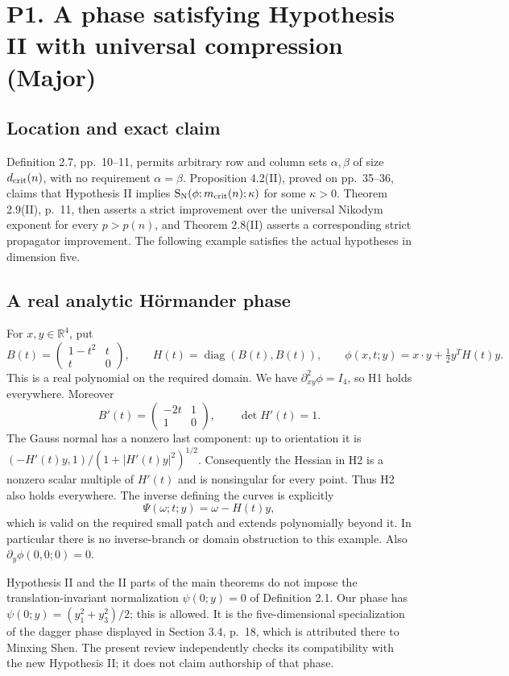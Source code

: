 \documentclass[10pt]{article}
\begin{document}
\section*{P1. A phase satisfying Hypothesis II with universal compression (Major)}
\subsection*{Location and exact claim}
Definition 2.7, pp. 10–11, permits arbitrary row and column sets \(\alpha,\beta\) of size \(d_{\rm crit}(n)\), with no requirement \(\alpha=\beta\). Proposition 4.2(II), proved on pp. 35–36, claims that Hypothesis II implies \(\mathrm{S}_{\mathrm N}(\phi;m_{\rm crit}(n);\kappa)\) for some \(\kappa>0\). Theorem 2.9(II), p. 11, then asserts a strict improvement over the universal Nikodym exponent for every \(p>p(n)\), and Theorem 2.8(II) asserts a corresponding strict propagator improvement. The following example satisfies the actual hypotheses in dimension five.\par
\subsection*{A real analytic Hörmander phase}
For \(x,y\in\mathbb R^4\), put \[B(t)=\begin{pmatrix}1-t^2&t\\t&0\end{pmatrix},\qquad
 H(t)=\operatorname{diag}(B(t),B(t)),\qquad
 \phi(x,t;y)=x\cdot y+\tfrac12 y^TH(t)y.\] This is a real polynomial on the required domain. We have \(\partial^2_{xy}\phi=I_4\), so H1 holds everywhere. Moreover \[B'(t)=\begin{pmatrix}-2t&1\\1&0\end{pmatrix},
 \qquad \det H'(t)=1.\] The Gauss normal has a nonzero last component: up to orientation it is \((-H'(t)y,1)/(1+|H'(t)y|^2)^{1/2}\). Consequently the Hessian in H2 is a nonzero scalar multiple of \(H'(t)\) and is nonsingular for every point. Thus H2 also holds everywhere. The inverse defining the curves is explicitly \[\Psi(\omega;t;y)=\omega-H(t)y,\] which is valid on the required small patch and extends polynomially beyond it. In particular there is no inverse-branch or domain obstruction to this example. Also \(\partial_y\phi(0,0;0)=0\).\par
Hypothesis II and the II parts of the main theorems do not impose the translation-invariant normalization \(\psi(0;y)=0\) of Definition 2.1. Our phase has \(\psi(0;y)=(y_1^2+y_3^2)/2\); this is allowed. It is the five-dimensional specialization of the dagger phase displayed in Section 3.4, p. 18, which is attributed there to Minxing Shen. The present review independently checks its compatibility with the new Hypothesis II; it does not claim authorship of that phase.\par
\end{document}
